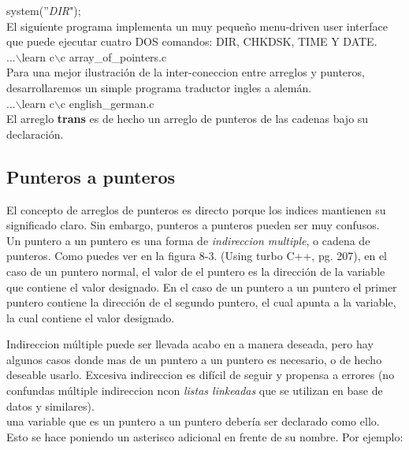 \documentclass[]{article}
\begin{document}
	system(''\textit{DIR}");\\
	
	El siguiente programa implementa un muy pequeño menu-driven user interface que puede ejecutar cuatro DOS comandos: DIR, CHKDSK, TIME Y DATE.\\
	
	...$\backslash$learn c$\backslash$c array\_of\_pointers.c\\
	
	Para una mejor ilustración de la inter-coneccion entre arreglos y punteros, desarrollaremos un simple programa traductor ingles a alemán.\\
	
	...$\backslash$learn c$\backslash$c english\_german.c\\
	
	El arreglo \textbf{trans} es de hecho un arreglo de punteros de las cadenas bajo su declaración.\\
	
	\subsection{Punteros a punteros}
	
	El concepto de arreglos de punteros es directo porque los indices mantienen su significado claro. Sin embargo, punteros a punteros pueden ser muy confusos.\\
	
	Un puntero a un puntero es una forma de \textit{indireccion multiple}, o cadena de punteros. Como puedes ver en la figura 8-3. (Using turbo C++, pg. 207), en el caso de un puntero normal, el valor de el puntero es la dirección de la variable que contiene el valor designado. En el caso de un puntero a un puntero el primer puntero contiene la dirección de el segundo puntero, el cual apunta a la variable, la cual contiene el valor designado.
	
	Indireccion múltiple puede ser llevada acabo en a manera deseada, pero hay algunos casos donde mas de un puntero a un puntero es necesario, o de hecho deseable usarlo. Excesiva indireccion es difícil de seguir y propensa a errores (no confundas múltiple indireccion ncon \textit{listas linkeadas} que se utilizan en base de datos y similares).\\
	
	una variable que es un puntero a un puntero debería ser declarado como ello. Esto se hace poniendo un asterisco adicional en frente de su nombre. Por ejemplo:\\
	
\end{document}
